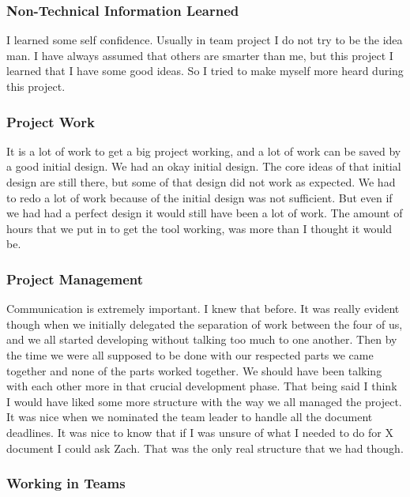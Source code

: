 \documentclass[letterpaper,10pt,titlepage,draftclsnofoot,onecolumn,onesided] {IEEEtran}
\begin{document}
\subsubsection{Non-Technical Information Learned}

I learned some self confidence.
Usually in team project I do not try to be the idea man. 
I have always assumed that others are smarter than me, but this project I learned that I have some good ideas.
So I tried to make myself more heard during this project.

\subsubsection{Project Work}

It is a lot of work to get a big project working, and a lot of work can be saved by a good initial design.
We had an okay initial design. 
The core ideas of that initial design are still there, but some of that design did not work as expected. 
We had to redo a lot of work because of the initial design was not sufficient.
But even if we had had a perfect design it would still have been a lot of work. 
The amount of hours that we put in to get the tool working, was more than I thought it would be. 

\subsubsection{Project Management}

Communication is extremely important. 
I knew that before.
It was really evident though when we initially delegated the separation of work between the four of us, and we all started developing without talking too much to one another. 
Then by the time we were all supposed to be done with our respected parts we came together and none of the parts worked together. 
We should have been talking with each other more in that crucial development phase.
That being said
I think I would have liked some more structure with the way we all managed the project. 
It was nice when we nominated the team leader to handle all the document deadlines.
It was nice to know that if I was unsure of what I needed to do for X document I could ask Zach.
That was the only real structure that we had though. 	

\subsubsection{Working in Teams}
\end{document}
